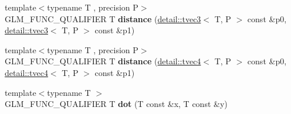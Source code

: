 \begin{DoxyCompactItemize}
\item 
\hypertarget{namespaceglm_a9e81696018e0d4ec6005f4aa5c159ebb}{{\footnotesize template$<$typename T , precision P$>$ }\\G\-L\-M\-\_\-\-F\-U\-N\-C\-\_\-\-Q\-U\-A\-L\-I\-F\-I\-E\-R T {\bfseries distance} (\hyperlink{structglm_1_1detail_1_1tvec3}{detail\-::tvec3}$<$ T, P $>$ const \&p0, \hyperlink{structglm_1_1detail_1_1tvec3}{detail\-::tvec3}$<$ T, P $>$ const \&p1)}\label{namespaceglm_a9e81696018e0d4ec6005f4aa5c159ebb}

\item 
\hypertarget{namespaceglm_aa4578d64c86a5af614f700eb8a68a732}{{\footnotesize template$<$typename T , precision P$>$ }\\G\-L\-M\-\_\-\-F\-U\-N\-C\-\_\-\-Q\-U\-A\-L\-I\-F\-I\-E\-R T {\bfseries distance} (\hyperlink{structglm_1_1detail_1_1tvec4}{detail\-::tvec4}$<$ T, P $>$ const \&p0, \hyperlink{structglm_1_1detail_1_1tvec4}{detail\-::tvec4}$<$ T, P $>$ const \&p1)}\label{namespaceglm_aa4578d64c86a5af614f700eb8a68a732}

\item 
\hypertarget{namespaceglm_a1998fa8aa0ed2caf8cb050bf8ca594eb}{{\footnotesize template$<$typename T $>$ }\\G\-L\-M\-\_\-\-F\-U\-N\-C\-\_\-\-Q\-U\-A\-L\-I\-F\-I\-E\-R T {\bfseries dot} (T const \&x, T const \&y)}\label{namespaceglm_a1998fa8aa0ed2caf8cb050bf8ca594eb}


\end{DoxyCompactItemize}
